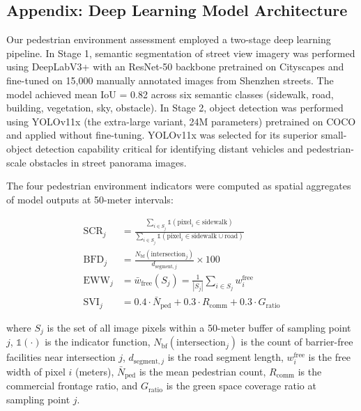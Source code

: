 \documentclass[10pt,conference,compsoc]{IEEEtran}
\begin{document}
\begin{table}[htbp]
\begin{center}
\section{Appendix: Deep Learning Model Architecture}
\label{appendix:dl_model}

Our pedestrian environment assessment employed a two-stage deep learning pipeline. In Stage 1, semantic segmentation of street view imagery was performed using DeepLabV3+ with an ResNet-50 backbone pretrained on Cityscapes and fine-tuned on 15{,}000 manually annotated images from Shenzhen streets. The model achieved mean IoU = 0.82 across six semantic classes (sidewalk, road, building, vegetation, sky, obstacle). In Stage 2, object detection was performed using YOLOv11x \cite{jocher2022yolo} (the extra-large variant, 24M parameters) pretrained on COCO and applied without fine-tuning. YOLOv11x was selected for its superior small-object detection capability critical for identifying distant vehicles and pedestrian-scale obstacles in street panorama images.

The four pedestrian environment indicators were computed as spatial aggregates of model outputs at 50-meter intervals:

\begin{align}
\text{SCR}_j &= \frac{\sum_{i \in S_j} \mathbb{1}(\text{pixel}_i \in \text{sidewalk})}{\sum_{i \in S_j} \mathbb{1}(\text{pixel}_i \in \text{sidewalk} \cup \text{road})} \label{eq:scr_def} \\
\text{BFD}_j &= \frac{N_{\text{bf}}(\text{intersection}_j)}{d_{\text{segment},j}} \times 100 \label{eq:bfd_def} \\
\text{EWW}_j &= \bar{w}_{\text{free}}(S_j) = \frac{1}{|S_j|} \sum_{i \in S_j} w_i^{\text{free}} \label{eq:eww_def} \\
\text{SVI}_j &= 0.4 \cdot \bar{N}_{\text{ped}} + 0.3 \cdot R_{\text{comm}} + 0.3 \cdot G_{\text{ratio}} \label{eq:svi_def}
\end{align}

where $S_j$ is the set of all image pixels within a 50-meter buffer of sampling point $j$, $\mathbb{1}(\cdot)$ is the indicator function, $N_{\text{bf}}(\text{intersection}_j)$ is the count of barrier-free facilities near intersection $j$, $d_{\text{segment},j}$ is the road segment length, $w_i^{\text{free}}$ is the free width of pixel $i$ (meters), $\bar{N}_{\text{ped}}$ is the mean pedestrian count, $R_{\text{comm}}$ is the commercial frontage ratio, and $G_{\text{ratio}}$ is the green space coverage ratio at sampling point $j$.


\end{center}
\end{table}
\end{document}

